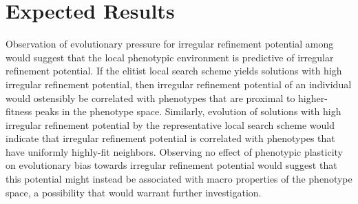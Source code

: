 \section{Expected Results}
Observation of evolutionary pressure for irregular refinement potential among would suggest that the local phenotypic environment is predictive of irregular refinement potential.
If the elitist local search scheme yields solutions with high irregular refinement potential, then irregular refinement potential of an individual would ostensibly be correlated with phenotypes that are proximal to higher-fitness peaks in the phenotype space.
Similarly, evolution of solutions with high irregular refinement potential by the representative local search scheme would indicate that irregular refinement potential is correlated with phenotypes that have uniformly highly-fit neighbors.
Observing no effect of phenotypic plasticity on evolutionary bias towards irregular refinement potential would suggest that this potential might instead be associated with macro properties of the phenotype space, a possibility that would warrant further investigation.
